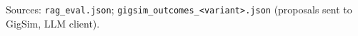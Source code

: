 Sources: \texttt{rag\_eval.json}; \texttt{gigsim\_outcomes\_<variant>.json} (proposals sent to GigSim, LLM client).
